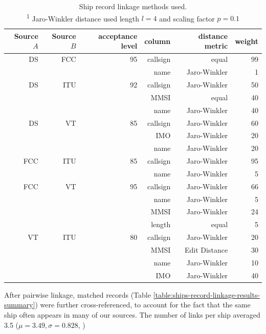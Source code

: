 \begin{table}[htbp]
  \begin{tabular}{rrrrrr} %
    \hline
    Source $A$ & Source $B$ & acceptance level & column & distance metric & weight \\
    \hline
     DS & FCC & 95 & callsign & equal & 99 \\
        &     &    & name & Jaro-Winkler & 1 \\
     DS & ITU & 92 & callsign & Jaro-Winkler & 50 \\
        &     &    & MMSI & equal & 40 \\
        &     &    & name & Jaro-Winkler & 40 \\
     DS &  VT & 85 & callsign & Jaro-Winkler & 60 \\
        &     &    & IMO & Jaro-Winkler & 20 \\
        &     &    & name & Jaro-Winkler & 20 \\
    FCC & ITU & 85 & callsign & Jaro-Winkler & 95 \\
        &     &    & name & Jaro-Winkler & 5 \\
    FCC &  VT & 95 & callsign & Jaro-Winkler & 66 \\
        &     &    & name & Jaro-Winkler & 5 \\
        &     &    & MMSI & Jaro-Winkler & 24 \\
        &     &    & length & equal & 5 \\
     VT & ITU & 80 & callsign & Jaro-Winkler & 20 \\
        &     &    & MMSI & Edit Distance & 30 \\
        &     &    & name & Jaro-Winkler & 10 \\
        &     &    & IMO & Jaro-Winkler & 40 \\
  \end{tabular}
  \caption{Ship record linkage methods used. \\
    \textsuperscript{1} Jaro-Winkler distance used length $l = 4$ and scaling factor $p = 0.1$}
  \label{table:ships-record-linkage-methods}
\end{table}

After pairwise linkage, matched records (Table \ref{table:ships-record-linkage-results-summary}) were further cross-referenced, to account for the fact that the same ship often appears in many of our sources. The number of links per ship averaged 3.5 ($\mu = 3.49, \sigma = 0.828$, ) %

